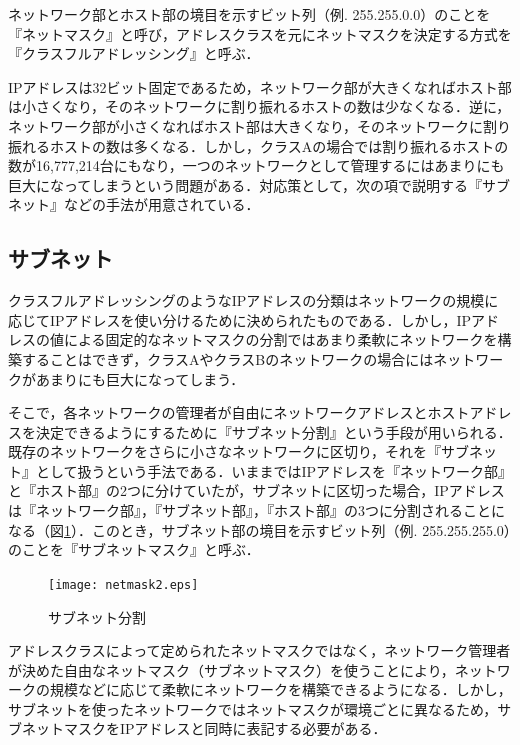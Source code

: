 ネットワーク部とホスト部の境目を示すビット列（例. 255.255.0.0）のことを『ネットマスク』と呼び，アドレスクラスを元にネットマスクを決定する方式を『クラスフルアドレッシング』と呼ぶ．

IPアドレスは32ビット固定であるため，ネットワーク部が大きくなればホスト部は小さくなり，そのネットワークに割り振れるホストの数は少なくなる．逆に，ネットワーク部が小さくなればホスト部は大きくなり，そのネットワークに割り振れるホストの数は多くなる．しかし，クラスAの場合では割り振れるホストの数が16,777,214台にもなり，一つのネットワークとして管理するにはあまりにも巨大になってしまうという問題がある．対応策として，次の項で説明する『サブネット』などの手法が用意されている．

\subsection{サブネット}
クラスフルアドレッシングのようなIPアドレスの分類はネットワークの規模に応じてIPアドレスを使い分けるために決められたものである．しかし，IPアドレスの値による固定的なネットマスクの分割ではあまり柔軟にネットワークを構築することはできず，クラスAやクラスBのネットワークの場合にはネットワークがあまりにも巨大になってしまう．

そこで，各ネットワークの管理者が自由にネットワークアドレスとホストアドレスを決定できるようにするために『サブネット分割』という手段が用いられる．既存のネットワークをさらに小さなネットワークに区切り，それを『サブネット』として扱うという手法である．いままではIPアドレスを『ネットワーク部』と『ホスト部』の2つに分けていたが，サブネットに区切った場合，IPアドレスは『ネットワーク部』，『サブネット部』，『ホスト部』の3つに分割されることになる（図\ref{fig:netmask2}）．このとき，サブネット部の境目を示すビット列（例. 255.255.255.0）のことを『サブネットマスク』と呼ぶ．

\begin{figure}[htb]
  \begin{center}
    \texttt{[image: netmask2.eps]}　
  \end{center}
  \caption{サブネット分割}
  \label{fig:netmask2}
\end{figure}

アドレスクラスによって定められたネットマスクではなく，ネットワーク管理者が決めた自由なネットマスク（サブネットマスク）を使うことにより，ネットワークの規模などに応じて柔軟にネットワークを構築できるようになる．しかし，サブネットを使ったネットワークではネットマスクが環境ごとに異なるため，サブネットマスクをIPアドレスと同時に表記する必要がある．

